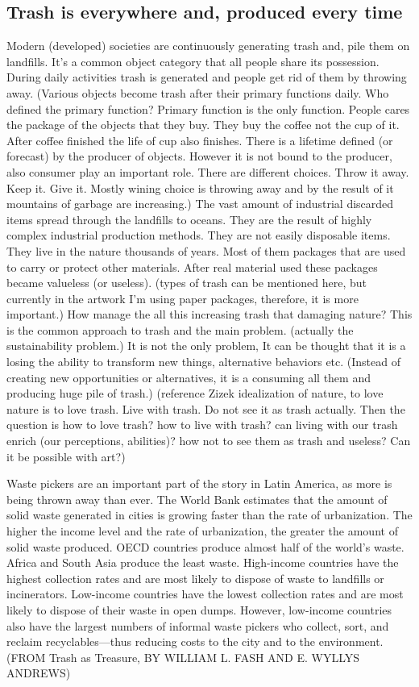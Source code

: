 \subsection{Trash is everywhere and, produced every time}
Modern (developed) societies are continuously generating trash and, pile them on landfills. It's a common object category that all people share its possession. During daily activities trash is generated and people get rid of them by throwing away. (Various objects become trash after their primary functions daily. Who defined the primary function? Primary function is the only function. People cares the package of the objects that they buy. They buy the coffee not the cup of it. After coffee finished the life of cup also finishes. There is a lifetime defined (or forecast) by the producer of objects. However it is not bound to the producer, also consumer play an important role. There are different choices. Throw it away. Keep it. Give it. Mostly wining choice is throwing away and by the result of it mountains of garbage are increasing.) The vast amount of industrial discarded items spread through the landfills to oceans. They are the result of highly complex industrial production methods. They are not easily disposable items. They live in the nature thousands of years. Most of them packages that are used to carry or protect other materials. After real material used these packages became valueless (or useless). (types of trash can be mentioned here, but currently in the artwork I'm using paper packages, therefore, it is more important.) How manage the all this increasing trash that damaging nature?  This is the common approach to trash and the main problem. (actually the sustainability problem.) It is not the only problem, It can be thought that it is a losing the ability to transform new things, alternative behaviors etc. (Instead of creating new opportunities or alternatives, it is a consuming all them and producing huge pile of trash.) (reference Zizek idealization of nature, to love nature is to love trash. Live with trash. Do not see it as trash actually. Then the question is how to love trash? how to live with trash? can living with our trash enrich (our perceptions, abilities)? how not to see them as trash and useless? Can it be possible with art?)

Waste pickers are an important part of the story in Latin America, as more is being thrown away than ever. The World Bank estimates that the amount of solid waste generated in cities is growing faster than the rate of urbanization. The higher the income level and the rate of urbanization, the greater the amount of solid waste produced. OECD countries produce almost half of the world’s waste. Africa and South Asia produce the least waste. High-income countries have the highest collection rates and are most likely to dispose of waste to landfills or incinerators. Low-income countries have the lowest collection rates and are most likely to dispose of their waste in open dumps. However, low-income countries also have the largest numbers of informal waste pickers who collect, sort, and reclaim recyclables---thus reducing costs to the city and to the environment. (FROM Trash as Treasure, BY WILLIAM L. FASH AND E. WYLLYS ANDREWS)

